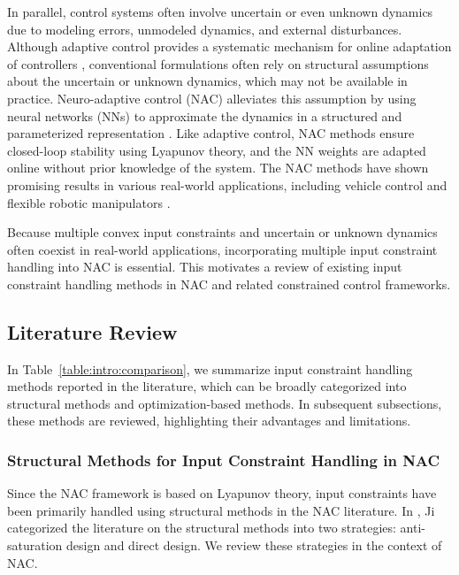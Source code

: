 \documentclass[letterpaper, journal]{IEEEtran}
\providecommand{\DIFdelbegin}{} %
\providecommand{\DIFdelend}{} %
\begin{document}
In parallel, control systems often involve uncertain or even unknown dynamics due to modeling errors, unmodeled dynamics, and external disturbances.
Although adaptive control provides a systematic mechanism for online adaptation of controllers \cite{Ioannou:2006aa}, conventional formulations often rely on structural assumptions about the uncertain or unknown dynamics, which may not be available in practice.
Neuro-adaptive control (NAC) alleviates this assumption by using neural networks (NNs) to approximate the dynamics in a structured and parameterized representation \cite{Farrell:2006aa,Patil:2022aa}.
Like adaptive control, NAC methods ensure closed-loop stability using Lyapunov theory, and the NN weights are adapted online without prior knowledge of the system.
The NAC methods have shown promising results in various real-world applications, including vehicle control \cite{You:2023aa} and flexible robotic manipulators \cite{Gao:2026aa}.

Because multiple convex input constraints and uncertain or unknown dynamics often coexist in real-world applications, incorporating multiple input constraint handling into NAC is essential.
This motivates a review of existing input constraint handling methods in NAC and related constrained control frameworks.

\subsection{Literature Review}


In Table~\ref{table:intro:comparison}, we summarize input constraint handling methods reported in the literature, which can be broadly categorized into structural methods and optimization-based methods.
In subsequent subsections, these methods are reviewed, highlighting their advantages and limitations.

\subsubsection{Structural Methods for Input Constraint Handling in NAC}

Since the NAC framework is based on Lyapunov theory, input constraints have been primarily handled using structural methods in the NAC literature.
\DIFdelbegin %
\DIFdelend In \cite{Ji:2025aa}, Ji \etal categorized the literature on the structural methods into two strategies: anti-saturation design and direct design.
We review these strategies in the context of NAC.
\end{document}
